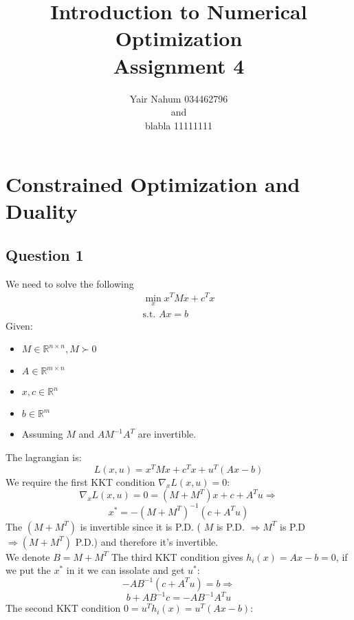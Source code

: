 \documentclass[12pt]{article}
\title{Introduction to Numerical Optimization\\Assignment 4}
\author{Yair Nahum 034462796\\and\\blabla 11111111 }
\begin{document}
\maketitle


\section{Constrained Optimization and Duality}

\subsection{Question 1}
We need to solve the following 
\begin{equation}
\label{eq:exp}
\begin{split}
    \min _x x^T M x + c^T x \\
    \text{s.t. } Ax = b
\end{split}
\end{equation}
Given:
\begin{itemize}
  \item $M \in \mathbb{R}^{n\times n},M \succ 0$
  \item $A \in \mathbb{R}^{m\times n}$
  \item $x,c \in \mathbb{R}^{n}$
  \item $b \in \mathbb{R}^{m}$
  \item Assuming $M$ and $AM^{-1}A^T$ are invertible.
\end{itemize}
The lagrangian is:
$$L(x,u)=x^T M x + c^T x + u^T(Ax-b)$$
We require the first KKT condition $\nabla_x L(x,u)=0$:
$$\nabla_x L(x,u)=0 = (M+M^T)x + c + A^Tu \Rightarrow$$
$$x^* = -(M+M^T)^{-1}(c + A^Tu)$$
The $(M+M^T)$ is invertible since it is P.D. ( $M$ is P.D. $\Rightarrow M^T$ is P.D $\Rightarrow (M+M^T)$ P.D.) and therefore it's invertible.\\
We denote $B=M+M^T$
The third KKT condition gives $h_i(x)=Ax-b=0$, if we put the $x^*$ in it we can issolate and get $u^*$:\\
$$-AB^{-1}(c + A^Tu) = b \Rightarrow$$
$$b+AB^{-1}c = -AB^{-1}A^Tu$$
The second KKT condition $0 = u^Th_i(x) = u^T(Ax-b)$:\\
\end{document}
